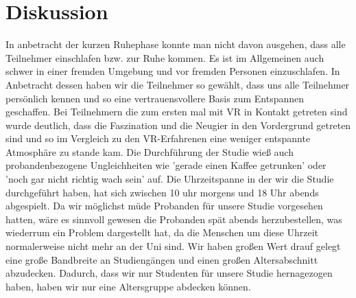 \chapter{Diskussion}

In anbetracht der kurzen Ruhephase konnte man nicht davon ausgehen, dass alle Teilnehmer einschlafen bzw. zur Ruhe kommen. Es ist im Allgemeinen auch schwer in einer fremden Umgebung und vor fremden Personen einzuschlafen. In Anbetracht dessen haben wir die Teilnehmer so gewählt, dass uns alle Teilnehmer persönlich kennen und so eine vertrauensvollere Basis zum Entspannen geschaffen. 
Bei Teilnehmern die zum ersten mal mit VR in Kontakt getreten sind wurde deutlich, dass die Faszination und die Neugier in den Vordergrund getreten sind und so im Vergleich zu den VR-Erfahrenen eine weniger entspannte Atmosphäre zu stande kam. 
Die Durchführung der Studie wieß auch probandenbezogene Ungleichheiten wie 'gerade einen Kaffee getrunken' oder 'noch gar nicht richtig wach sein' auf. Die Uhrzeitspanne in der wir die Studie durchgeführt haben, hat sich zwischen 10 uhr morgens und 18 Uhr abends abgespielt. Da wir möglichst müde Probanden für unsere Studie vorgesehen hatten, wäre es sinnvoll gewesen die Probanden spät abends herzubestellen, was wiederrum ein Problem dargestellt hat, da die Menschen um diese Uhrzeit normalerweise nicht mehr an der Uni sind.
Wir haben großen Wert drauf gelegt eine große Bandbreite an Studiengängen und einen großen Altersabschnitt abzudecken. Dadurch, dass wir nur Studenten für unsere Studie hernagezogen haben, haben wir nur eine Altersgruppe abdecken können.



